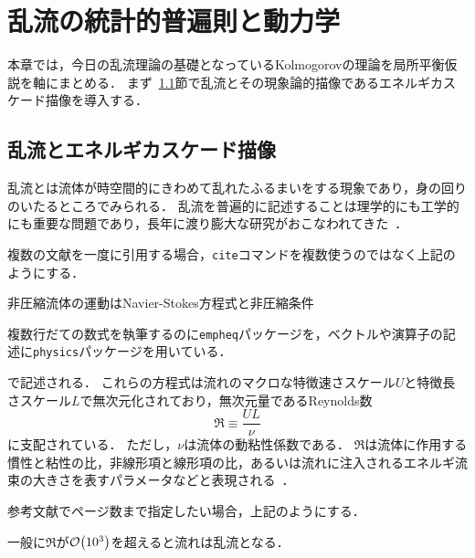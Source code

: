 \chapter{乱流の統計的普遍則と動力学}
\label{chap:StatisticalUniversalityAndDynamicsOfTurbulence}

本章では，今日の乱流理論の基礎となっているKolmogorovの理論を局所平衡仮説を軸にまとめる．
まず~\ref{sec:TurbulenceAndEnergyCascadePicture}節で乱流とその現象論的描像であるエネルギカスケード描像を導入する．


\section{乱流とエネルギカスケード描像}
\label{sec:TurbulenceAndEnergyCascadePicture}

乱流とは流体が時空間的にきわめて乱れたふるまいをする現象であり，身の回りのいたるところでみられる．
乱流を普遍的に記述することは理学的にも工学的にも重要な問題であり，長年に渡り膨大な研究がおこなわれてきた~\cite{tennekes1972first,Landau1987Fluid,KidaYanase,frisch1995tlk}．
\begin{tcolorbox}
  複数の文献を一度に引用する場合，\texttt{cite}コマンドを複数使うのではなく上記のようにする．
\end{tcolorbox}

非圧縮流体の運動はNavier-Stokes方程式と非圧縮条件
\begin{tcolorbox}
  複数行だての数式を執筆するのに\texttt{empheq}パッケージを，ベクトルや演算子の記述に\texttt{physics}パッケージを用いている．
\end{tcolorbox}
で記述される．
これらの方程式は流れのマクロな特徴速さスケール$U$と特徴長さスケール$L$で無次元化されており，無次元量であるReynolds数
\begin{equation}
  \Re \equiv \frac{UL}{\nu}
  \label{eq:LEHASU_DefOfReynoldsNumber}
\end{equation}
に支配されている．
ただし，$\nu$は流体の動粘性係数である．
$\Re$は流体に作用する慣性と粘性の比，非線形項と線形項の比，あるいは流れに注入されるエネルギ流束の大きさを表すパラメータなどと表現される~\cite[p.~8, p.~409]{Tatsumi}．
\begin{tcolorbox}
  参考文献でページ数まで指定したい場合，上記のようにする．
\end{tcolorbox}
一般に$\Re$が$\order{10^3}$を超えると流れは乱流となる．

